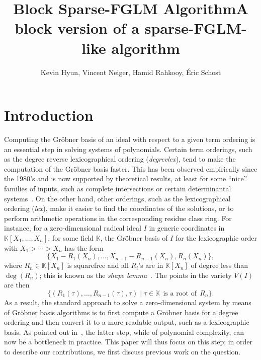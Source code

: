 \documentclass[12pt]{article}
\title{Block Sparse-FGLM Algorithm}
\title{A block version of a sparse-FGLM-like algorithm}
\author{Kevin Hyun, Vincent Neiger, Hamid Rahkooy, \'Eric Schost}
\def\K{\mathbb{K}}
\def\K {\ensuremath{\mathbb{K}}}
\begin{document}
\maketitle


\section{Introduction}

Computing the Gr\"obner basis of an ideal with respect to a given
term ordering is an essential step in solving systems of polynomials.
Certain term orderings, such as the degree reverse lexicographical
ordering (\textit{degrevlex}), tend to make the computation of the
Gr\"obner basis faster. This has been observed empirically since the
1980's and is now supported by theoretical results, at least for some
``nice'' families of inputs, such as complete intersections or certain
determinantal systems~\cite{Faugere02,FaSaSp13,BaFaSa15}.  On the
other hand, other orderings, such as the lexicographical ordering
(\textit{lex}), make it easier to find the coordinates of the
solutions, or to perform arithmetic operations in the corresponding
residue class ring.  For instance, for a zero-dimensional radical
ideal $I$ in generic coordinates in $\K[X_1,\dots,X_n]$, for some field $\K$,
the Gr\"obner basis of $I$ for the lexicographic order with $X_1 > \cdots > X_n$
has the form
\begin{equation}\label{eq:shapelemma}
 \{ X_1 - R_1(X_n),\dots, X_{n-1}-R_{n-1}(X_n),R_n(X_n)\},
\end{equation}
where $R_n \in \K[X_n]$ is squarefree and all $R_i$'s are in $\K[X_n]$
of degree less than $\deg(R_n)$; this is known as the {\em shape
  lemma}~\cite{GiMo89}. The points in the variety $V(I)$ are then
  $$\{ ( R_1(\tau), \dots, R_{n-1}(\tau), \tau ) \mid \tau \in \K
  \;\,\text{is a root of}\;\, R_n\}.$$ As a result, the standard approach to
 solve a zero-dimensional system by means of Gr\"obner basis
 algorithms is to first compute a Gr\"obner basis for a degree ordering
 and then convert it to a more readable output, such as a lexicographic
 basis. As pointed out in~\cite{FaMo17}, the latter step, while of
 polynomial complexity, can now be a bottleneck in practice. This
 paper will thus focus on this step; in order to describe our 
 contributions, we first discuss previous work on the question.
\end{document}
